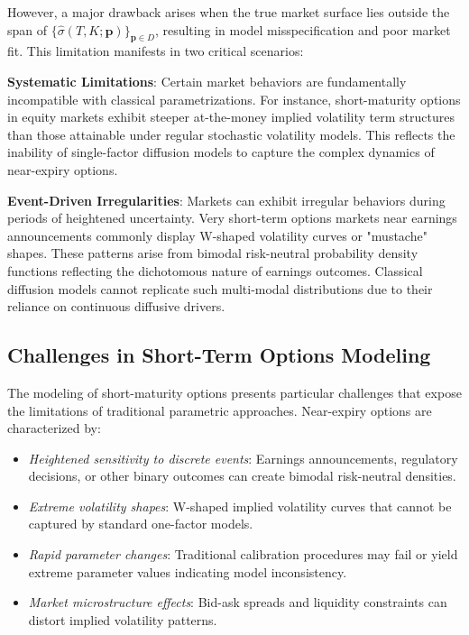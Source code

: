 However, a major drawback arises when the true market surface lies outside the span of $\{\hat{\sigma}(T,K; \mathbf{p})\}_{\mathbf{p} \in D}$, resulting in model misspecification and poor market fit.
This limitation manifests in two critical scenarios:

\textbf{Systematic Limitations}: Certain market behaviors are fundamentally incompatible with classical parametrizations. For instance, short-maturity options in equity markets exhibit steeper at-the-money implied volatility term structures than those attainable under regular stochastic volatility models. This reflects the inability of single-factor diffusion models to capture the complex dynamics of near-expiry options.

\textbf{Event-Driven Irregularities}: Markets can exhibit irregular behaviors during periods of heightened uncertainty. Very short-term options markets near earnings announcements commonly display W-shaped volatility curves or "mustache" shapes. These patterns arise from bimodal risk-neutral probability density functions reflecting the dichotomous nature of earnings outcomes. Classical diffusion models cannot replicate such multi-modal distributions due to their reliance on continuous diffusive drivers.

\subsection{Challenges in Short-Term Options Modeling}

The modeling of short-maturity options presents particular challenges that expose the limitations of traditional parametric approaches. Near-expiry options are characterized by:

\begin{itemize}
    \item \textit{Heightened sensitivity to discrete events}: Earnings announcements, regulatory decisions, or other binary outcomes can create bimodal risk-neutral densities.
    \item \textit{Extreme volatility shapes}: W-shaped implied volatility curves that cannot be captured by standard one-factor models.
    \item \textit{Rapid parameter changes}: Traditional calibration procedures may fail or yield extreme parameter values indicating model inconsistency.
    \item \textit{Market microstructure effects}: Bid-ask spreads and liquidity constraints can distort implied volatility patterns.
\end{itemize}

